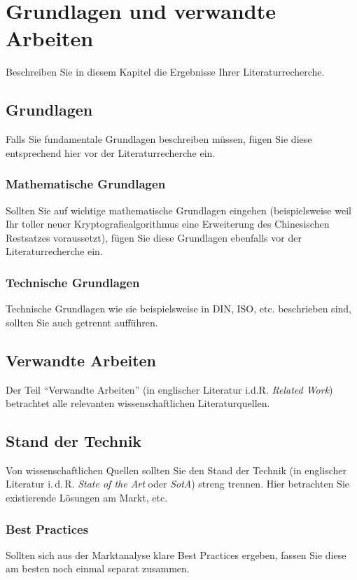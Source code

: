 \chapter{Grundlagen und verwandte Arbeiten}\label{chap:RelatedWork}
Beschreiben Sie in diesem Kapitel die Ergebnisse Ihrer Literaturrecherche.

\section{Grundlagen}\label{sec:RelatedWork:Foundations}
Falls Sie fundamentale Grundlagen beschreiben müssen, fügen Sie diese entsprechend hier vor der Literaturrecherche ein.

\subsection{Mathematische Grundlagen}\label{subsec:RelatedWork:Foundations:Maths}
Sollten Sie auf wichtige mathematische Grundlagen eingehen (beispielsweise weil Ihr toller neuer Kryptografiealgorithmus eine Erweiterung des Chinesischen Restsatzes voraussetzt), fügen Sie diese Grundlagen ebenfalls vor der Literaturrecherche ein.

\subsection{Technische Grundlagen}\label{subsec:RelatedWork:Foundations:Techs}
Technische Grundlagen wie sie beispielsweise in DIN, ISO, etc. beschrieben sind, sollten Sie auch getrennt aufführen.

\section{Verwandte Arbeiten}\label{sec:RelatedWork:Publications}
Der Teil \enquote{Verwandte Arbeiten} (in englischer Literatur i.d.R. \emph{Related Work}) betrachtet alle relevanten wissenschaftlichen Literaturquellen.

\section{Stand der Technik}\label{sec:RelatedWork:SotA}
Von wissenschaftlichen Quellen sollten Sie den Stand der Technik (in englischer Literatur i.\,d.\,R. \emph{State of the Art} oder \emph{SotA}) streng trennen. Hier betrachten Sie existierende Lösungen am Markt, etc.

\subsection{Best Practices}\label{subsec:RelatedWork:BestPractices}
Sollten sich aus der Marktanalyse klare Best Practices ergeben, fassen Sie diese am besten noch einmal separat zusammen.